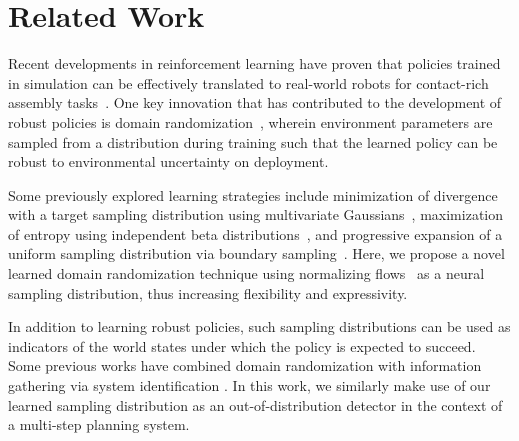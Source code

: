 \section{Related Work}
Recent developments in reinforcement learning have proven that policies trained in simulation can be effectively translated to real-world robots for contact-rich assembly tasks~\citep{dynamic_compliance, industreal, forge, Jin2023}. One key innovation that has contributed to the development of robust policies is domain randomization~\citep{understanding_dr, original_dr}, wherein environment parameters are sampled from a distribution during training such that the learned policy can be robust to environmental uncertainty on deployment. 

Some previously explored learning strategies include minimization of divergence with a target sampling distribution using multivariate Gaussians~\citep{gaussian_dr}, maximization of entropy using independent beta distributions~\citep{entmax}, and progressive expansion of a uniform sampling distribution via boundary sampling~\citep{adr}. Here, we propose a novel learned domain randomization technique using normalizing flows~\cite{rezende2015variational} as a neural sampling distribution, thus increasing flexibility and expressivity.

In addition to learning robust policies, such sampling distributions can be used as indicators of the world states under which the policy is expected to succeed. Some previous works have combined domain randomization with information gathering via system identification \citep{bayessim, normflows_adaptive_dr}. In this work, we similarly make use of our learned sampling distribution as an out-of-distribution detector in the context of a multi-step planning system.